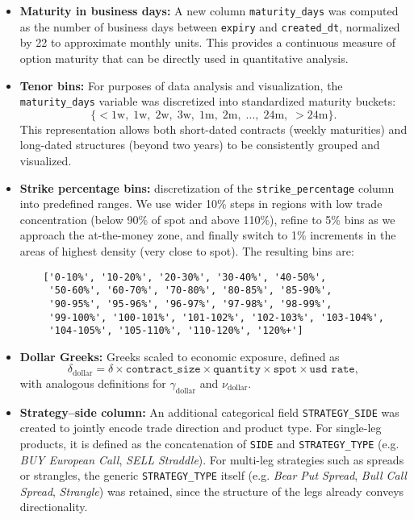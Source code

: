 \documentclass[12pt,a4paper]{report}
\begin{document}
\begin{itemize}

    \item \textbf{Maturity in business days:} 
    A new column \texttt{maturity\_days} was computed as the number of business days between 
    \texttt{expiry} and \texttt{created\_dt}, normalized by 22 to approximate monthly units. 
    This provides a continuous measure of option maturity that can be directly used in quantitative analysis.
    
    \item \textbf{Tenor bins:} 
    For purposes of data analysis and visualization, the \texttt{maturity\_days} variable was discretized 
    into standardized maturity buckets: 
    \[
    \{ <1\text{w},\; 1\text{w},\; 2\text{w},\; 3\text{w},\; 1\text{m},\; 2\text{m},\; \dots,\; 24\text{m},\; >24\text{m} \}.
    \] 
    This representation allows both short-dated contracts (weekly maturities) and long-dated structures 
    (beyond two years) to be consistently grouped and visualized.
    
    
    \item \textbf{Strike percentage bins:} discretization of the \texttt{strike\_percentage} column into predefined ranges. 
    We use wider 10\% steps in regions with low trade concentration (below 90\% of spot and above 110\%), refine to 5\% bins 
    as we approach the at-the-money zone, and finally switch to 1\% increments in the areas of highest density (very close to spot). 
    The resulting bins are:
    \begin{verbatim}
    ['0-10%', '10-20%', '20-30%', '30-40%', '40-50%',
     '50-60%', '60-70%', '70-80%', '80-85%', '85-90%',
     '90-95%', '95-96%', '96-97%', '97-98%', '98-99%',
     '99-100%', '100-101%', '101-102%', '102-103%', '103-104%',
     '104-105%', '105-110%', '110-120%', '120%+']
    \end{verbatim}



    \item \textbf{Dollar Greeks:} Greeks scaled to economic exposure, defined as
    \[
        \delta_{\text{dollar}} = \delta \times \texttt{contract\_size} \times \texttt{quantity} \times \texttt{spot} \times \texttt{usd rate},
    \]
    with analogous definitions for \(\gamma_{\text{dollar}}\) and \(\nu_{\text{dollar}}\).

    \item \textbf{Strategy--side column:} 
    An additional categorical field \texttt{STRATEGY\_SIDE} was created to jointly encode trade direction 
    and product type. For single-leg products, it is defined as the concatenation of \texttt{SIDE} and 
    \texttt{STRATEGY\_TYPE} (e.g. \emph{BUY European Call}, \emph{SELL Straddle}). For multi-leg strategies 
    such as spreads or strangles, the generic \texttt{STRATEGY\_TYPE} itself (e.g. \emph{Bear Put Spread}, 
    \emph{Bull Call Spread}, \emph{Strangle}) was retained, since the structure of the legs already conveys 
    directionality.


\end{itemize}
\end{document}
